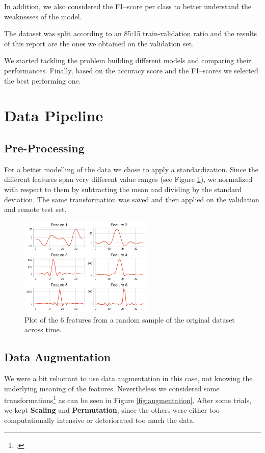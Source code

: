 \documentclass[conference,compsoc,11pt]{IEEEtran}
\begin{document}
In addition, we also considered the F1--score per class to better understand the weaknesses of the model.

The dataset was split according to an 85:15 train-validation ratio and the results of this report are the ones we obtained on the validation set.

We started tackling the problem building different models and comparing their performances. Finally, based on the accuracy score and the F1--scores we selected the best performing one.

\section{Data Pipeline}

\subsection{Pre-Processing}

For a better modelling of the data we chose to apply a standardization. Since the different features span very different value ranges (see Figure \ref{fig:features}), we normalized with respect to them by subtracting the mean and dividing by the standard deviation.
The same transformation was saved and then applied on the validation and remote test set.

\begin{figure}[h!]
\centering
\includegraphics[width=2.5in]{datum_5.pdf}
\caption{Plot of the 6 features from a random sample of the original dataset across time.}
\label{fig:features}
\end{figure}

\subsection{Data Augmentation}

We were a bit reluctant to use data augmentation in this case, not knowing the underlying meaning of the features. Nevertheless we considered some transformations\footcite{Iwana_2021} as can be seen in Figure \ref{fig:augmentation}. After some trials, we kept \textbf{Scaling} and \textbf{Permutation}, since the others were either too computationally intensive or deteriorated too much the data.
\end{document}
